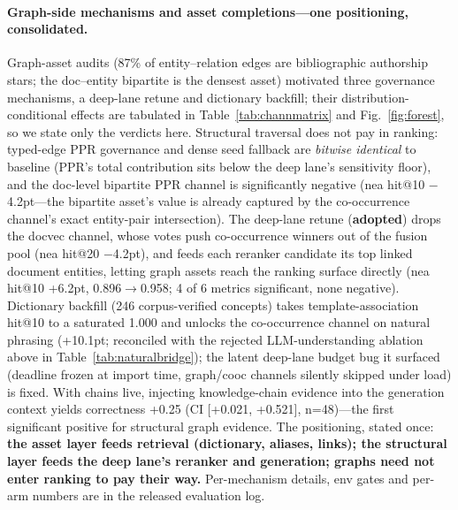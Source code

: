 \documentclass[sigconf,nonacm]{acmart}
\begin{document}
\paragraph{Graph-side mechanisms and asset completions---one
positioning, consolidated.} Graph-asset audits (87\% of entity--relation
edges are bibliographic authorship stars; the doc--entity bipartite is the
densest asset) motivated three governance mechanisms, a deep-lane retune
and dictionary backfill; their distribution-conditional effects are
tabulated in Table~\ref{tab:channmatrix} and Fig.~\ref{fig:forest}, so we
state only the verdicts here. Structural traversal does not pay in
ranking: typed-edge PPR governance and dense seed fallback are
\emph{bitwise identical} to baseline (PPR's total contribution sits below
the deep lane's sensitivity floor), and the doc-level bipartite PPR
channel is significantly negative (nea hit@10 $-$4.2pt---the bipartite
asset's value is already captured by the co-occurrence channel's exact
entity-pair intersection). The deep-lane retune (\textbf{adopted}) drops
the docvec channel, whose votes push co-occurrence winners out of the
fusion pool (nea hit@20 $-$4.2pt), and feeds each reranker candidate its
top linked document entities, letting graph assets reach the ranking
surface directly (nea hit@10 +6.2pt, 0.896$\to$0.958; 4 of 6 metrics
significant, none negative). Dictionary backfill (246 corpus-verified
concepts) takes template-association hit@10 to a saturated 1.000 and
unlocks the co-occurrence channel on natural phrasing (+10.1pt;
reconciled with the rejected LLM-understanding ablation above in
Table~\ref{tab:naturalbridge}); the latent deep-lane budget bug it
surfaced (deadline frozen at import time, graph/cooc channels silently
skipped under load) is fixed. With chains live, injecting knowledge-chain
evidence into the generation context yields correctness +0.25 (CI
[+0.021, +0.521], n=48)---the first significant positive for structural
graph evidence. The positioning, stated once: \textbf{the asset layer
feeds retrieval (dictionary, aliases, links); the structural layer feeds
the deep lane's reranker and generation; graphs need not enter ranking to
pay their way.} Per-mechanism details, env gates and per-arm numbers are
in the released evaluation log.
\end{document}
